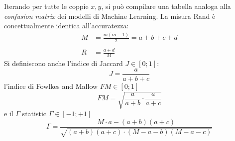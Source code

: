 \documentclass[11pt, a4page, twocolumn]{article}
\begin{document}
Iterando per tutte le coppie $x, y$, si può compilare una tabella analoga alla \textit{confusion matrix} dei modelli di Machine Learning.
La misura Rand è concettualmente identica all'accuratezza:
\begin{align*}
  M &= \frac{m(m-1)}{2} = a + b + c + d \\ \\
  R &= \frac{a+d}{M}
\end{align*}
Si definiscono anche l'indice di Jaccard $J \in [0; 1]$:
\begin{equation*}
  J = \frac{a}{a + b + c}
\end{equation*}
l'indice di Fowlkes and Mallow $FM \in [0; 1]$
\begin{equation*}
  FM = \sqrt{\frac{a}{a+b} \cdot \frac{a}{a+c}}
\end{equation*}
e il $\Gamma$ statistic $\Gamma \in [-1; +1]$
\begin{equation*}
  \Gamma = \frac{M \cdot a - (a+b)(a+c)}{\sqrt{(a+b)(a+c) \cdot (M - a - b)(M - a - c)}}
\end{equation*}
\end{document}
